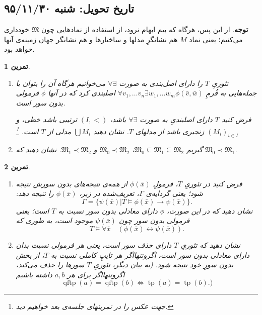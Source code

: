 \documentclass[12pt,a4paper]{report}
\theoremstyle{colorhead}
\newtheorem{tam}{تمرین}
\DeclareMathOperator{\qftp}{qftp}
\DeclareMathOperator{\tp}{tp}
\begin{document}
\subsection*{تاریخ تحویل: شنبه ۹۵/۱۱/۳۰}
\textbf{توجه}. از این پس، هرگاه که بیم ابهام نرود، از استفاده از نمادهایی چون
$\mathfrak{M}$
خودداری می‌کنیم؛‌ یعنی نماد
$M$
هم نشانگرِ مدلها و ساختارها و  هم  نشانگر جهان زمینه‌ی آنها خواهد بود.
\par 
{}
\begin{tam}\hfill
\label{existsforallaxiom}
\begin{enumerate}
\item 
تئوریِ
$T$
را
دارای 
اصل‌بندی به صورت
$\forall \exists$
می‌خوانیم
 هرگاه آن را بتوان با جمله‌هایی به فُرمِ
$\forall v_1,\ldots v_n \exists w_1,\ldots w_m \phi(\bar{v},\bar{w})$
اصلبندی کرد که در آنها
$\phi$
فرمولی بدون سور است. 
\par 
فرض کنید 
$T$
دارای اصلبندیِ به‌ صورت
$\forall \exists$
باشد،
$(I,<)$
ترتیبی باشد خطی،‌ و 
$(M_i)_{i\in I}$
زنجیری  باشد از مدلهای
$T$.
نشان دهید 
$\bigcup M_i$
مدلی از
$T$
است. 
\footnote{جهت عکس را در تمرینهای جلسه‌ی بعد خواهیم دید.}
\item 
گیریم 
$\mathfrak{M}_0\subseteq \mathfrak{M}_1\subseteq \mathfrak{M}_2$،
$\mathfrak{M}_0\prec \mathfrak{M}_2$
و
$\mathfrak{M}_1\prec \mathfrak{M}_2$.
نشان دهید که
$\mathfrak{M}_0\prec \mathfrak{M}_1$.
\end{enumerate}
\end{tam}
\par 
{}
\begin{tam}
\label{qftp}
\hfill
\begin{enumerate}
\item 
فرض کنید در تئوریِ
$T$،
فرمولِ
$\phi(\bar{x})$
از همه‌ی نتیجه‌های بدون سورش نتیجه شود؛ یعنی گردایه‌ی 
$\Gamma$،
تعریف‌شده در زیر،
$\phi(\bar{x})$
را نتیجه دهد:
\[
\Gamma=\{\psi(\bar{x})| T\models \phi(\bar{x})\to \psi(\bar{x})\}.
\]
نشان دهید که در این صورت،
$\phi$
دارای معادلی بدون سور نسبت به
$T$
است؛ یعنی فرمولی بدون سور چون
$\psi(\bar{x})$
موجود است، به طوری که
\[
T\models \forall \bar{x}\quad \left(\phi(\bar{x})\leftrightarrow\psi(\bar{x})\right).
\]
\item
نشان دهید که تئوریِ
$T$
دارای حذف سور است، یعنی هر فرمولی نسبت بدان  دارای معادلی بدون سور است، اگروتنهااگر هر تایپِ کاملی نسبت به
$T$،
از بخش بدون سورِ خود نتیجه شود.  (به بیان دیگر، تئوریِ
$T$
سورها را حذف می‌کند، اگروتنهااگر برای هر
$a,b$
داشته باشیم
\[
\qftp(a)=\qftp(b)\Leftrightarrow \tp(a)=\tp(b).)
\]
\end{enumerate}
\end{tam}
\end{document}

